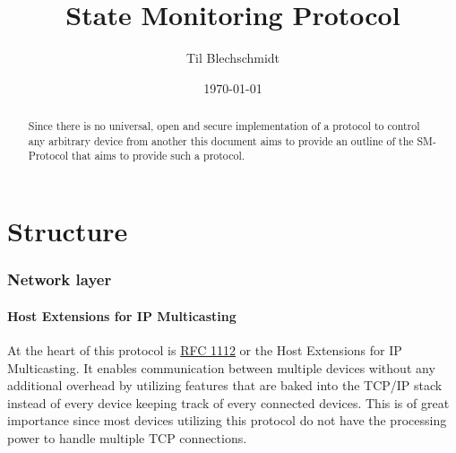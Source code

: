 \documentclass[11pt,a4paper, titlepage]{article}
\title{State Monitoring Protocol}
\author{Til Blechschmidt\\ \email{til@blechschmidt.de}}
\date{\today}
\begin{document}
	\maketitle
	
	\begin{abstract}
		Since there is no universal, open and secure implementation of a protocol to control any arbitrary device from another this document aims to provide an outline of the SM-Protocol that aims to provide such a protocol.
	\end{abstract}
	
	\newpage
	
	\tableofcontents	
	\listoflistings
	
	\newpage
	
	\part{Structure}
		\section{Network layer}
			\subsection[RFC 1112]{Host Extensions for IP Multicasting}
				\label{subsec:multicast}
				At the heart of this protocol is \href{https://www.ietf.org/rfc/rfc1112.txt}{RFC 1112} or the Host Extensions for IP Multicasting. It enables communication between multiple devices without any additional overhead by utilizing features that are baked into the TCP/IP stack instead of every device keeping track of every connected devices. This is of great importance since most devices utilizing this protocol do not have the processing power to handle multiple TCP connections.
\end{document}
